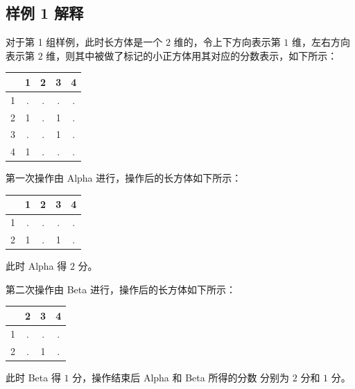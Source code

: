 \subsection{样例 1 解释}

对于第 1 组样例，此时长方体是一个 $2$ 维的，令上下方向表示第 $1$ 维，左右方向表示第 $2$ 维，则其中被做了标记的小正方体用其对应的分数表示，如下所示：
\begin{table}[htbp]
      \begin{center}
         \begin{tabular}{|c|c|c|c|c|}
          \hline
          & 1 & 2 & 3 & 4 \\ \hline
          1 & .& .& .& . \\\hline
          2 & 1 & .& 1&. \\\hline
          3 &   .& .& 1 &.\\ \hline
          4 & 1 &. &. & .\\\hline
        \end{tabular}
      \end{center}
\end{table}


第一次操作由 Alpha 进行，操作后的长方体如下所示：

\begin{table}[htbp]
      \begin{center}
         \begin{tabular}{|c|c|c|c|c|}
          \hline
          & 1 & 2 & 3 & 4 \\ \hline
          1 & .& .& .& . \\\hline
          2 & 1 & .& 1&. \\\hline
        \end{tabular}
      \end{center}
\end{table}
\vspace{-2ex}
此时 Alpha 得 $2$ 分。

第二次操作由 Beta 进行，操作后的长方体如下所示：

\begin{table}[htbp]
      \begin{center}
         \begin{tabular}{|c|c|c|c|}
          \hline
          &  2 & 3 & 4 \\ \hline
          1 &  .& .& . \\\hline
          2 & .& 1&. \\\hline
        \end{tabular}
      \end{center}
\end{table}
\vspace{-2ex}
此时 Beta 得 $1$ 分，操作结束后 Alpha 和 Beta 所得的分数 分别为 $2$ 分和 $1$ 分。



